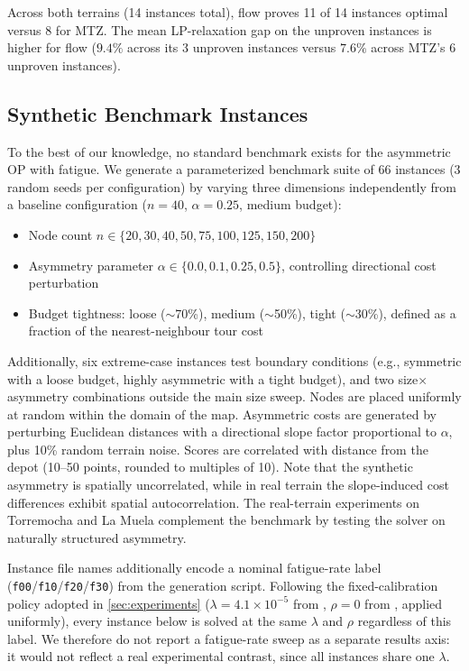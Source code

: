 \documentclass[11pt,a4paper]{article}
\begin{document}
Across both terrains (14 instances total), flow proves 11 of 14 instances optimal versus 8 for MTZ.
The mean LP-relaxation gap on the unproven instances is higher for flow ($9.4\%$ across its 3 unproven instances versus $7.6\%$ across MTZ's 6 unproven instances).

\subsection{Synthetic Benchmark Instances}
\label{sec:benchmark}

To the best of our knowledge, no standard benchmark exists for the asymmetric OP with fatigue.
We generate a parameterized benchmark suite of 66 instances (3 random seeds per configuration) by varying three dimensions independently from a baseline configuration ($n = 40$, $\alpha = 0.25$, medium budget):
\begin{itemize}[nosep]
  \item Node count $n \in \{20, 30, 40, 50, 75, 100, 125, 150, 200\}$
  \item Asymmetry parameter $\alpha \in \{0.0, 0.1, 0.25, 0.5\}$, controlling directional cost perturbation
  \item Budget tightness: loose ($\sim$70\%), medium ($\sim$50\%), tight ($\sim$30\%), defined as a fraction of the nearest-neighbour tour cost
\end{itemize}
Additionally, six extreme-case instances test boundary conditions (e.g., symmetric with a loose budget, highly asymmetric with a tight budget), and two size$\times$asymmetry combinations outside the main size sweep.
Nodes are placed uniformly at random within the domain of the map.
Asymmetric costs are generated by perturbing Euclidean distances with a directional slope factor proportional to $\alpha$, plus 10\% random terrain noise.
Scores are correlated with distance from the depot (10--50 points, rounded to multiples of 10).
Note that the synthetic asymmetry is spatially uncorrelated, while in real terrain the slope-induced cost differences exhibit spatial autocorrelation. The real-terrain experiments on Torremocha and La Muela complement the benchmark by testing the solver on naturally structured asymmetry.

Instance file names additionally encode a nominal fatigue-rate label (\texttt{f00}/\texttt{f10}/\texttt{f20}/\texttt{f30}) from the generation script.
Following the fixed-calibration policy adopted in \cref{sec:experiments} ($\lambda = 4.1\times10^{-5}$ from \citet{jaencarrillo2025}, $\rho = 0$ from \citet{vernillo2015}, applied uniformly), every instance below is solved at the same $\lambda$ and $\rho$ regardless of this label.
We therefore do not report a fatigue-rate sweep as a separate results axis: it would not reflect a real experimental contrast, since all instances share one $\lambda$.
\end{document}
